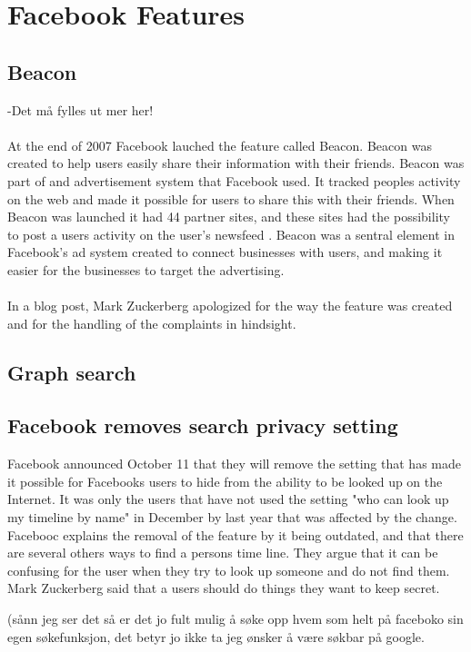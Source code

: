 \section{Facebook Features}\label{sec:facebook_features}

\subsection{Beacon}
-Det må fylles ut mer her!

\paragraph{}
At the end of 2007 Facebook lauched the feature called Beacon. Beacon was created to help users easily share their information with their friends. Beacon was part of and advertisement system that Facebook used. It tracked peoples activity on the web and made it possible for users to share this with their friends. When Beacon was launched it had 44 partner sites, and these sites had the possibility to post a users activity on the user's newsfeed \cite{BeaconWebsites}. Beacon was a sentral element in Facebook's ad system created to connect businesses with users, and making it easier for the businesses to target the advertising. 

\paragraph{}
In a blog post, Mark Zuckerberg apologized for the way the feature was created and for the handling of the complaints in hindsight. 
\cite{Beacon} 


\subsection{Graph search}


\subsection{Facebook removes search privacy setting}
Facebook announced October 11 that they will remove the setting that has made it possible for Facebooks users to hide from the ability to be looked up on the Internet\cite{searchSetting}. It was only the users that have not used the setting "who can look up my timeline by name" in December by last year that was affected by the change. Facebooc explains the removal of the feature by it being outdated, and that there are several others ways to find a persons time line. They argue that it can be confusing for the user when they try to look up someone and do not find them. Mark Zuckerberg said that a users should do things they want to keep secret.

(sånn jeg ser det så er det jo fult mulig å søke opp hvem som helt på faceboko sin egen søkefunksjon, det betyr jo ikke ta jeg ønsker å være søkbar på google. 



